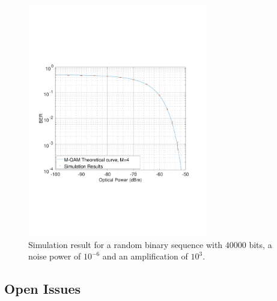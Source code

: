\begin{figure}[h]
	\centering
	\includegraphics[clip, trim=2cm 6cm 2cm 6cm, width=0.7\textwidth]{./sdf/m_qam_system/figures/BER_QPSK_sim_20180124.pdf}
	\caption{Simulation result for a random binary sequence with $40000$ bits, a noise power of $10^{-6}$ and an amplification of $10^3$.}
	\label{fig:ber_pseudorandom}
\end{figure}%

\subsection{Open Issues}

\newpage



\renewcommand{\bibname}{References}
%


%
%


\cleardoublepage